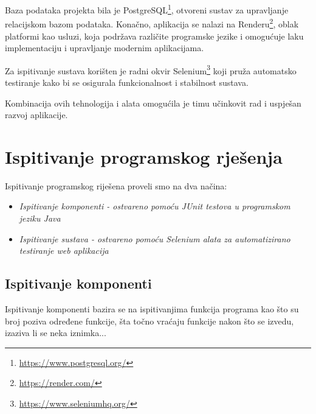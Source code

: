 			 Baza podataka projekta bila je PostgreSQL\footnote{\url{https://www.postgresql.org/}}, otvoreni sustav za upravljanje relacijskom bazom podataka. Konačno, aplikacija se nalazi na Renderu\footnote{\url{https://render.com/}}, oblak platformi kao usluzi, koja podržava različite programske jezike i omogućuje laku implementaciju i upravljanje modernim aplikacijama.
			 
			 Za ispitivanje sustava korišten je radni okvir Selenium\footnote{\url{https://www.seleniumhq.org/}} koji pruža automatsko testiranje kako bi se osigurala funkcionalnost i stabilnost sustava.
			 
			 Kombinacija ovih tehnologija i alata omogućila je timu učinkovit rad i uspješan razvoj aplikacije.
			
			
			\eject 
		
	
		\section{Ispitivanje programskog rješenja}
		
			 
			 Ispitivanje programskog riješena proveli smo na dva načina:
			 \begin{itemize}
			 	\item \textit{Ispitivanje komponenti - ostvareno pomoću JUnit testova u programskom jeziku Java}
			 	\item \textit{Ispitivanje sustava - ostvareno pomoću Selenium alata za automatizirano testiranje web aplikacija}
			 \end{itemize}
			 	
			 
			 
	
			
			\subsection{Ispitivanje komponenti}
			Ispitivanje komponenti bazira se na ispitivanjima funkcija programa kao što su broj poziva određene funkcije, šta točno vraćaju funkcije nakon što se izvedu, izaziva li se neka iznimka...
			
